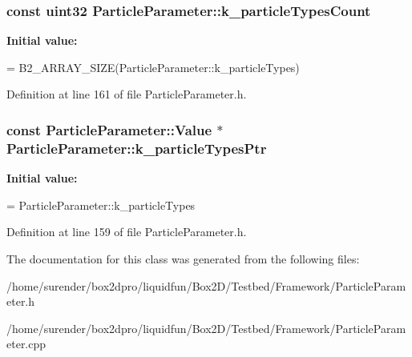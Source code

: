 \hypertarget{classParticleParameter_aa311f7df22a956a5f426dbae10ee98f2}{
\subsubsection[{k\-\_\-particle\-Types\-Count}]{\setlength{\rightskip}{0pt plus 5cm}const uint32 Particle\-Parameter\-::k\-\_\-particle\-Types\-Count\hspace{0.3cm}{\ttfamily [static]}}}\label{classParticleParameter_aa311f7df22a956a5f426dbae10ee98f2}
{\bfseries Initial value\-:}
\begin{DoxyCode}
=
    B2\_ARRAY\_SIZE(ParticleParameter::k\_particleTypes)
\end{DoxyCode}


Definition at line 161 of file Particle\-Parameter.\-h.

\hypertarget{classParticleParameter_a36233222cea81fb18d1b8c530f9d75ad}{
\subsubsection[{k\-\_\-particle\-Types\-Ptr}]{\setlength{\rightskip}{0pt plus 5cm}const {\bf Particle\-Parameter\-::\-Value} $\ast$ Particle\-Parameter\-::k\-\_\-particle\-Types\-Ptr\hspace{0.3cm}{\ttfamily [static]}}}\label{classParticleParameter_a36233222cea81fb18d1b8c530f9d75ad}
{\bfseries Initial value\-:}
\begin{DoxyCode}
=
    ParticleParameter::k\_particleTypes
\end{DoxyCode}


Definition at line 159 of file Particle\-Parameter.\-h.



The documentation for this class was generated from the following files\-:\begin{DoxyCompactItemize}
\item 
/home/surender/box2dpro/liquidfun/\-Box2\-D/\-Testbed/\-Framework/Particle\-Parameter.\-h\item 
/home/surender/box2dpro/liquidfun/\-Box2\-D/\-Testbed/\-Framework/Particle\-Parameter.\-cpp\end{DoxyCompactItemize}
